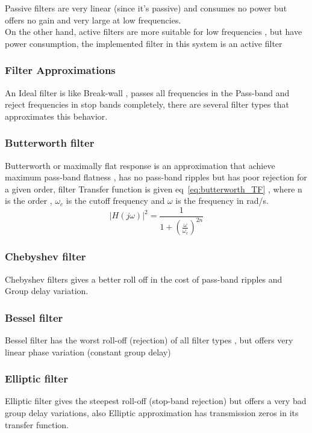 Passive filters are very linear (since it's passive) and
consumes no power but offers 
no gain and very large at low frequencies.\\
On the other hand, active filters are more suitable for 
low frequencies , but  have power consumption, the implemented 
filter in this system is an active filter

\subsubsection{Filter Approximations}%
An Ideal filter is like Break-wall , passes all frequencies in 
the Pass-band and reject frequencies in stop bands completely,
there are several filter types that approximates this behavior.
\subsubsection{Butterworth filter}%
Butterworth or maximally flat response is an approximation that 
achieve maximum pass-band flatness , has no pass-band ripples but
has poor rejection for a given order, filter Transfer function is 
given eq~\ref{eq:butterworth_TF} , where n is the order , 
$\omega_c$ is the cutoff frequency and $\omega$ is the frequency
in rad/s.
\begin{equation}
    |H(j\omega)|^2 = \frac{1}{1+(\frac{\omega}{\omega_c})^{2n}}
    \label{eq:butterworth_TF}
\end{equation}
\subsubsection{Chebyshev filter}%
Chebyshev filters gives a better roll off in the cost of pass-band
ripples and Group delay variation.
\subsubsection{Bessel filter}%
Bessel filter has the worst roll-off (rejection) of all filter 
types , but offers very linear phase variation (constant group 
delay)
\subsubsection{Elliptic filter}%
Elliptic filter gives the steepest roll-off (stop-band rejection)
but offers a very bad group delay variations, also Elliptic
approximation has transmission zeros in its transfer function.

